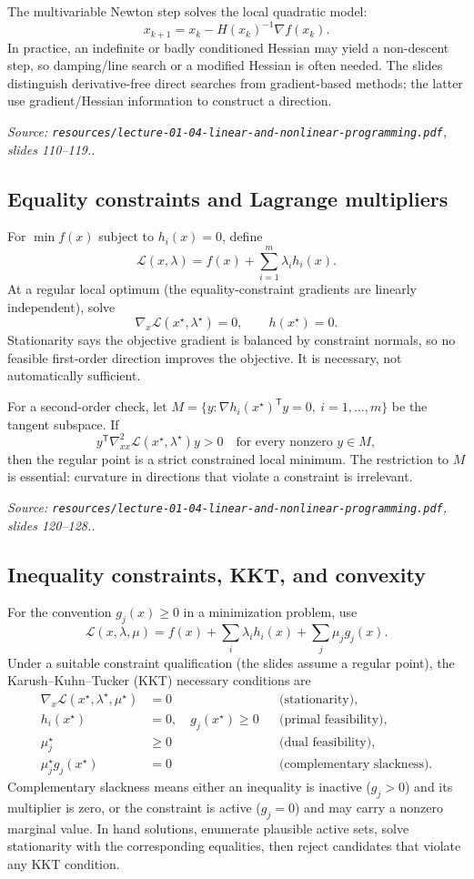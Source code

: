 \documentclass[11pt,a4paper]{article}
\renewcommand{\texttt}[1]{\nolinkurl{#1}}
\newcommand{\T}{\mathsf{T}}
\newcommand{\source}[1]{\par\smallskip\noindent\textit{Source: #1.}\par\smallskip}
\begin{document}
The multivariable Newton step solves the local quadratic model:
\[
 x_{k+1}=x_k-H(x_k)^{-1}\nabla f(x_k).
\]
In practice, an indefinite or badly conditioned Hessian may yield a non-descent step, so damping/line search or a modified Hessian is often needed. The slides distinguish derivative-free direct searches from gradient-based methods; the latter use gradient/Hessian information to construct a direction.
\source{\texttt{resources/lecture-01-04-linear-and-nonlinear-programming.pdf}, slides 110--119.}

\subsection{Equality constraints and Lagrange multipliers}
For $\min f(x)$ subject to $h_i(x)=0$, define
\[
 \mathcal{L}(x,\lambda)=f(x)+\sum_{i=1}^m\lambda_i h_i(x).
\]
At a regular local optimum (the equality-constraint gradients are linearly independent), solve
\begin{equation}
 \nabla_x\mathcal{L}(x^\star,\lambda^\star)=0,\qquad h(x^\star)=0.
\end{equation}
Stationarity says the objective gradient is balanced by constraint normals, so no feasible first-order direction improves the objective. It is necessary, not automatically sufficient.

For a second-order check, let $M=\{y:\nabla h_i(x^\star)^\T y=0,\ i=1,\ldots,m\}$ be the tangent subspace. If
\[
 y^\T\nabla^2_{xx}\mathcal{L}(x^\star,\lambda^\star)y>0\quad\text{for every nonzero }y\in M,
\]
then the regular point is a strict constrained local minimum. The restriction to $M$ is essential: curvature in directions that violate a constraint is irrelevant.
\source{\texttt{resources/lecture-01-04-linear-and-nonlinear-programming.pdf}, slides 120--128.}

\subsection{Inequality constraints, KKT, and convexity}
For the convention $g_j(x)\geq0$ in a minimization problem, use
\[
 \mathcal{L}(x,\lambda,\mu)=f(x)+\sum_i\lambda_i h_i(x)+\sum_j\mu_jg_j(x).
\]
Under a suitable constraint qualification (the slides assume a regular point), the Karush--Kuhn--Tucker (KKT) necessary conditions are
\begin{align*}
 \nabla_x\mathcal{L}(x^\star,\lambda^\star,\mu^\star)&=0 &&\text{(stationarity)},\\
 h_i(x^\star)&=0,\quad g_j(x^\star)\geq0 &&\text{(primal feasibility)},\\
 \mu_j^\star&\geq0 &&\text{(dual feasibility)},\\
 \mu_j^\star g_j(x^\star)&=0 &&\text{(complementary slackness)}.
\end{align*}
Complementary slackness means either an inequality is inactive ($g_j>0$) and its multiplier is zero, or the constraint is active ($g_j=0$) and may carry a nonzero marginal value. In hand solutions, enumerate plausible active sets, solve stationarity with the corresponding equalities, then reject candidates that violate any KKT condition.
\end{document}
